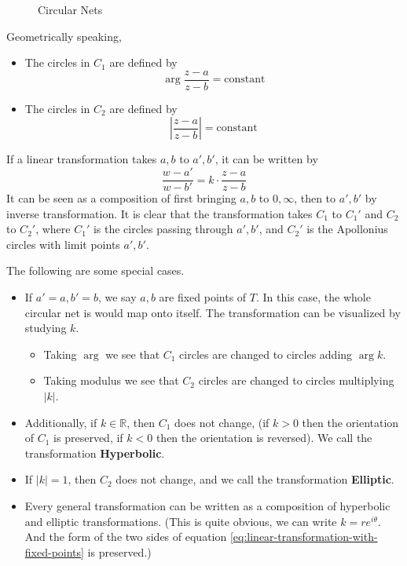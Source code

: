 \documentclass[../main.tex]{subfiles}
\begin{document}
\begin{figure}[ht]
    \centering
    \caption{Circular Nets}
    \label{fig:circular-nets}
\end{figure}

\begin{remark}
Geometrically speaking,
\begin{itemize}
\item The circles in $C_1$ are defined by
	\begin{equation*}
		\arg \frac{z-a}{z-b} = \text{constant}
	\end{equation*}
\item The circles in $C_2$ are defined by
	\begin{equation*}
		\left| \frac{z-a}{z-b} \right| = \text{constant}
	\end{equation*}
\end{itemize}
\end{remark}

If a linear transformation takes $a,b$ to $a',b'$, it can be written by
\begin{equation}\label{eq:linear-transformation-with-fixed-points}
	\frac{w-a'}{w-b'} = k \cdot \frac{z-a}{z-b}
\end{equation}
It can be seen as a composition of first bringing $a,b$ to $0,\infty $, then to $a',b'$ by inverse transformation. It is clear that the transformation takes $C_1$ to $C_1'$ and $C_2$ to $C_2'$, where $C_1'$ is the circles passing through $a',b'$, and $C_2'$ is the Apollonius circles with limit points $a',b'$.

The following are some special cases.
\begin{itemize}
\item If $a'=a,b'=b$, we say $a,b$ are fixed points of $T$. In this case, the whole circular net is would map onto itself. The transformation can be visualized by studying $k$.
	\begin{itemize}
	\item Taking $\arg$ we see that $C_1$ circles are changed to circles adding $\arg k$.
	\item Taking modulus we see that $C_2$ circles are changed to circles multiplying $\left|k\right|$.
	\end{itemize}
\item Additionally, if $k\in \mathbb{R}$, then $C_1$ does not change, (if $k>0$ then the orientation of $C_1$ is preserved, if $k<0$ then the orientation is reversed). We call the transformation \textbf{Hyperbolic}.
\item If $\left|k\right|=1$, then $C_2$ does not change, and we call the transformation \textbf{Elliptic}.
\item Every general transformation can be written as a composition of hyperbolic and elliptic transformations. (This is quite obvious, we can write $k = r e^{i \theta}$. And the form of the two sides of equation \ref{eq:linear-transformation-with-fixed-points} is preserved.)
\end{itemize}
\end{document}
